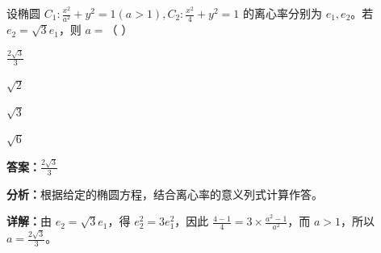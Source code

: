 \begin{question}[points=5]
设椭圆 $C_1:\frac{x^2}{a^2}+y^2=1(a>1), C_2:\frac{x^2}{4}+y^2=1$ 的离心率分别为 $e_1, e_2$。若 $e_2=\sqrt{3}e_1$，则 $a=$（ ）
\begin{choices}
  \item $\frac{2\sqrt{3}}{3}$
  \item $\sqrt{2}$
  \item $\sqrt{3}$
  \item $\sqrt{6}$
\end{choices}
\begin{solution}
\textbf{答案：}$\frac{2\sqrt{3}}{3}$

\textbf{分析：}根据给定的椭圆方程，结合离心率的意义列式计算作答。

\textbf{详解：}由 $e_2=\sqrt{3}e_1$，得 $e_2^2=3e_1^2$，因此 $\frac{4-1}{4}=3\times\frac{a^2-1}{a^2}$，而 $a>1$，所以 $a=\frac{2\sqrt{3}}{3}$。
\end{solution}
\end{question}

